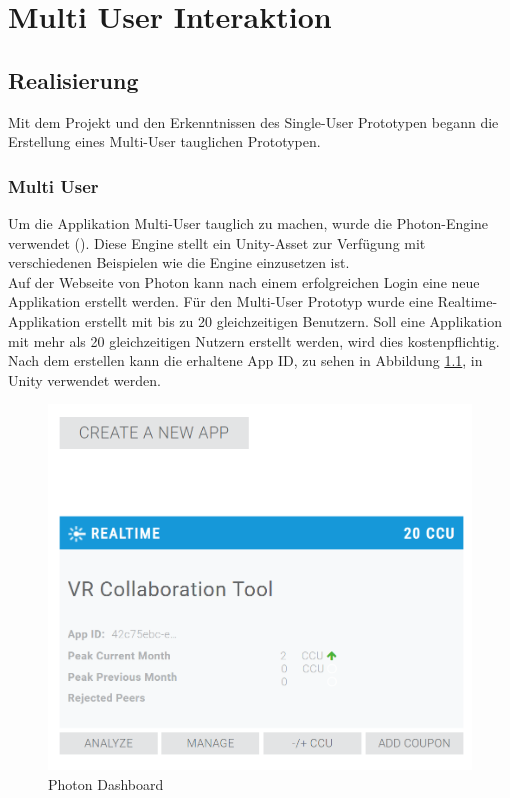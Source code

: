 \chapter{Multi User Interaktion}
\label{ch:Multi_User_Interaktion}

\section{Realisierung}
Mit dem Projekt und den Erkenntnissen des Single-User Prototypen begann die Erstellung eines Multi-User tauglichen Prototypen.

\subsection{Multi User}
\label{ch:multi_user}
Um die Applikation Multi-User tauglich zu machen, wurde die Photon-Engine verwendet (\cite{noauthor_photon_2019}). Diese Engine stellt ein Unity-Asset zur Verfügung mit verschiedenen Beispielen wie die Engine einzusetzen ist. \\

\noindent Auf der Webseite von Photon kann nach einem erfolgreichen Login eine neue Applikation erstellt werden. Für den Multi-User Prototyp wurde eine Realtime-Applikation erstellt mit bis zu 20 gleichzeitigen Benutzern. Soll eine Applikation mit mehr als 20 gleichzeitigen Nutzern erstellt werden, wird dies kostenpflichtig. Nach dem erstellen kann die erhaltene App ID, zu sehen in Abbildung \ref{fig:photon_dashboard}, in Unity verwendet werden.

\begin{figure}[h!]
	\centering
	\includegraphics[keepaspectratio,width=0.4\linewidth]{img/Photon_Dashboard.PNG}
	\caption{Photon Dashboard}
	\label{fig:photon_dashboard}
\end{figure} 

